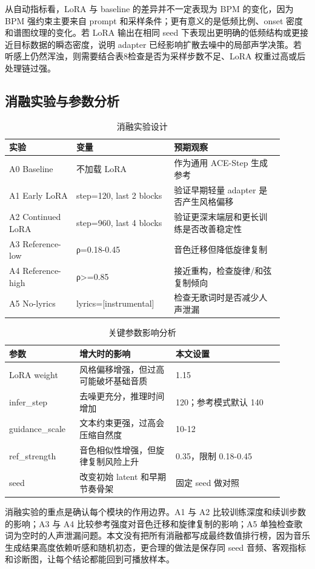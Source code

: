 \documentclass[UTF8,a4paper,zihao=-4,fontset=none]{ctexart}
\begin{document}
从自动指标看，LoRA 与 baseline 的差异并不一定表现为 BPM 的变化，因为 BPM 强约束主要来自 prompt 和采样条件；更有意义的是低频比例、onset 密度和谱图纹理的变化。若 LoRA 输出在相同 seed 下表现出更明确的低频结构或更接近目标数据的瞬态密度，说明 adapter 已经影响扩散去噪中的局部声学决策。若听感上仍然浑浊，则需要结合表8检查是否为采样步数不足、LoRA 权重过高或后处理链过强。

\subsection{消融实验与参数分析}
\begin{table}[H]
\centering
\caption{消融实验设计}
\small
\begin{tabular}{p{0.22\linewidth}p{0.32\linewidth}p{0.36\linewidth}}
\toprule
实验 & 变量 & 预期观察 \\
\midrule
A0 Baseline & 不加载 LoRA & 作为通用 ACE-Step 生成参考 \\
A1 Early LoRA & step=120, last 2 blocks & 验证早期轻量 adapter 是否产生风格偏移 \\
A2 Continued LoRA & step=960, last 4 blocks & 验证更深末端层和更长训练是否改善稳定性 \\
A3 Reference-low & ρ=0.18-0.45 & 音色迁移但降低旋律复制 \\
A4 Reference-high & ρ>=0.85 & 接近重构，检查旋律/和弦复制倾向 \\
A5 No-lyrics & lyrics=[instrumental] & 检查无歌词时是否减少人声泄漏 \\
\bottomrule
\end{tabular}
\end{table}
\begin{table}[H]
\centering
\caption{关键参数影响分析}
\small
\begin{tabular}{p{0.22\linewidth}p{0.32\linewidth}p{0.36\linewidth}}
\toprule
参数 & 增大时的影响 & 本文设置 \\
\midrule
LoRA weight & 风格偏移增强，但过高可能破坏基础音质 & 1.15 \\
infer\_step & 去噪更充分，推理时间增加 & 120；参考模式默认 140 \\
guidance\_scale & 文本约束更强，过高会压缩自然度 & 10-12 \\
ref\_strength & 音色相似性增强，但旋律复制风险上升 & 0.35，限制 0.18-0.45 \\
seed & 改变初始 latent 和早期节奏骨架 & 固定 seed 做对照 \\
\bottomrule
\end{tabular}
\end{table}
消融实验的重点是确认每个模块的作用边界。A1 与 A2 比较训练深度和续训步数的影响；A3 与 A4 比较参考强度对音色迁移和旋律复制的影响；A5 单独检查歌词为空时的人声泄漏问题。本文没有把所有消融都写成最终数值排行榜，因为音乐生成结果高度依赖听感和随机初态，更合理的做法是保存同 seed 音频、客观指标和诊断图，让每个结论都能回到可播放样本。
\end{document}
